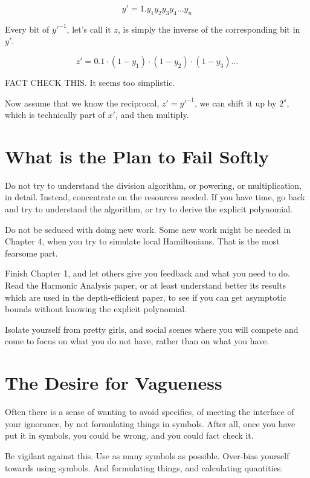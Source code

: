 \documentclass{article}
\begin{document}
\begin{equation}
y' = 1.y_1 y_2 y_3 y_4 \ldots y_n
\end{equation} 

Every bit of $y'^{-1}$, let's call it $z$, is simply the inverse of the
corresponding bit in $y'$.

\begin{equation}
z' = 0.1\cdot (1-y_1) \cdot (1-y_2) \cdot (1-y_3) \ldots
\end{equation}

FACT CHECK THIS. It seems too simplistic.

Now assume that we know the reciprocal, $z' = y'^{-1}$, we can shift it
up by $2^s$, which is technically part of $x'$, and then multiply.

\section{What is the Plan to Fail Softly}

Do not try to understand the division algorithm, or powering, or 
multiplication, in detail. Instead, concentrate on the resources needed.
If you have time, go back and try to understand the algorithm, or try to
derive the explicit polynomial.

Do not be seduced with doing new work. Some new work might be needed in
Chapter 4, when you try to simulate local Hamiltonians. That is the
most fearsome part.

Finish Chapter 1, and let others give you feedback and what you need to
do. Read the Harmonic Analysis paper, or at least understand better its
results which are used in the depth-efficient paper, to see if you can
get asymptotic bounds without knowing the explicit polynomial.

Isolate yourself from pretty girls, and social scenes where you will compete
and come to focus on what you do not have, rather than on what you have.

\section{The Desire for Vagueness}

Often there is a sense of wanting to avoid specifics, of meeting the
interface of your ignorance, by not formulating things in symbols. After
all, once you have put it in symbols, you could be wrong, and you could
fact check it.

Be vigilant against this. Use as many symbols as possible. Over-bias
yourself towards using symbols. And formulating things, and calculating
quantities.
\end{document}
